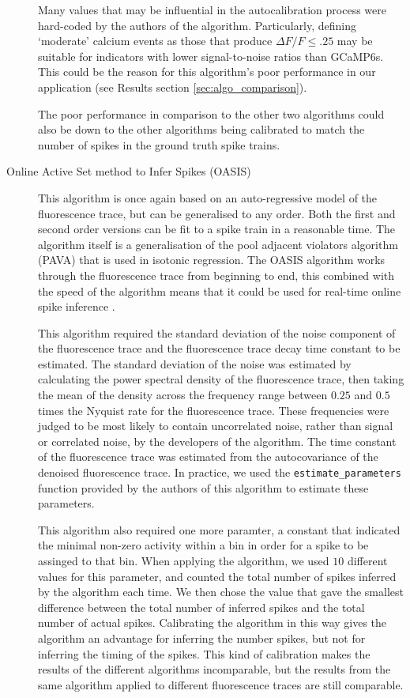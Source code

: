 \begin{description}
    Many values that may be influential in the autocalibration process were hard-coded by the authors of the algorithm. Particularly, defining `moderate' calcium events as those that produce $\Delta F/F \leq .25$ may be suitable for indicators with lower signal-to-noise ratios than GCaMP6s. This could be the reason for this algorithm's poor performance in our application (see Results section \ref{sec:algo_comparison}).

    The poor performance in comparison to the other two algorithms could also be down to the other algorithms being calibrated to match the number of spikes in the ground truth spike trains.

    \item[Online Active Set method to Infer Spikes (OASIS)] This algorithm is once again based on an auto-regressive model of the fluorescence trace, but can be generalised to any order. Both the first and second order versions can be fit to a spike train in a reasonable time. The algorithm itself is a generalisation of the pool adjacent violators algorithm (PAVA) that is used in isotonic regression. The OASIS algorithm works through the fluorescence trace from beginning to end, this combined with the speed of the algorithm means that it could be used for real-time online spike inference  \parencite{friedrich}.

    This algorithm required the standard deviation of the noise component of the fluorescence trace and the fluorescence trace decay time constant to be estimated. The standard deviation of the noise was estimated by calculating the power spectral density of the fluorescence trace, then taking the mean of the density across the frequency range between $0.25$ and $0.5$ times the Nyquist rate for the fluorescence trace. These frequencies were judged to be most likely to contain uncorrelated noise, rather than signal or correlated noise, by the developers of the algorithm. The time constant of the fluorescence trace was estimated from the autocovariance of the denoised fluorescence trace. In practice, we used the \texttt{estimate\_parameters} function provided by the authors of this algorithm to estimate these parameters.

    This algorithm also required one more paramter, a constant that indicated the minimal non-zero activity within a bin in order for a spike to be assinged to that bin. When applying the algorithm, we used $10$ different values for this parameter, and counted the total number of spikes inferred by the algorithm each time. We then chose the value that gave the smallest difference between the total number of inferred spikes and the total number of actual spikes. Calibrating the algorithm in this way gives the algorithm an advantage for inferring the number spikes, but not for inferring the timing of the spikes. This kind of calibration makes the results of the different algorithms incomparable, but the results from the same algorithm applied to different fluorescence traces are still comparable.
\end{description}
